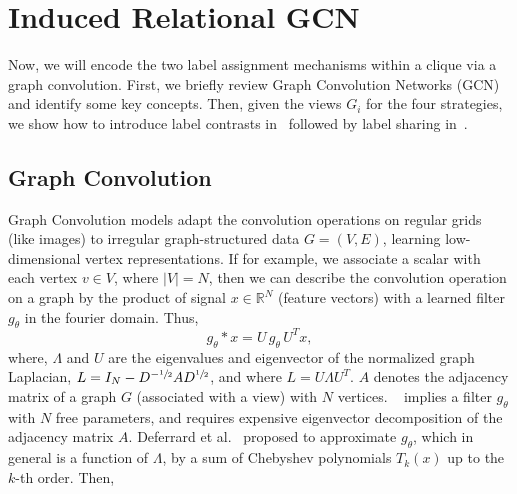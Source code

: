 \section{Induced Relational GCN}
\label{sec:gcn}
Now, we will encode the two label assignment mechanisms within a clique
via a graph convolution. First, we briefly review Graph Convolution Networks (GCN) and identify some key concepts. Then, given the views $G_i$ for the four strategies, we show how to introduce label contrasts in~ followed by label sharing in~.


\subsection{Graph Convolution}
\label{subsec:graph}
Graph Convolution models adapt the convolution operations on regular grids (like images) to irregular graph-structured data $G = (V,E)$, learning low-dimensional vertex representations. If for example, we associate a scalar with each vertex $v \in V$, where $|V| = N$, then we can describe the convolution operation on a graph by the product of signal $x \in \mathbb{R}^N$ (feature vectors) with a learned filter $g_\theta$ in the fourier domain. Thus,
\begin{equation}
  g_\theta \ast x =  U \, g_\theta \, U^T x,
  \label{eq:basic_gcn}
\end{equation}
where, $\Lambda$ and $U$ are the eigenvalues and eigenvector of the normalized graph Laplacian, $L = I_N - D^{-\sfrac{1}{2}}AD^{\sfrac{1}{2}}$, and where $L = U \Lambda U^T$. $A$ denotes the adjacency matrix of a graph $G$ (associated with a view) with $N$ vertices. ~ implies a filter $g_\theta$ with $N$ free parameters, and requires expensive eigenvector decomposition of the adjacency matrix $A$. Deferrard et al.~\cite{deferrard} proposed to approximate $g_\theta$, which in general is a function of $\Lambda$, by a sum of Chebyshev polynomials $T_k(x)$ up to the $k$-th order. Then,

